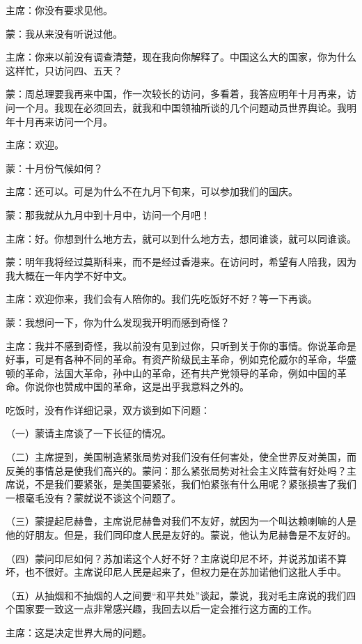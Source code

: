 主席：你没有要求见他。

蒙：我从来没有听说过他。

主席：你来以前没有调查清楚，现在我向你解释了。中国这么大的国家，你为什么这样忙，只访问四、五天？

蒙：周总理要我再来中国，作一次较长的访问，多看着，我答应明年十月再来，访问一个月。我现在必须回去，就我和中国领袖所谈的几个问题动员世界舆论。我明年十月再来访问一个月。

主席：欢迎。

蒙：十月份气候如何？

主席：还可以。可是为什么不在九月下旬来，可以参加我们的国庆。

蒙：那我就从九月中到十月中，访问一个月吧！

主席：好。你想到什么地方去，就可以到什么地方去，想同谁谈，就可以同谁谈。

蒙：明年我将经过莫斯科来，而不是经过香港来。在访问时，希望有人陪我，因为我大概在一年内学不好中文。

主席：欢迎你来，我们会有人陪你的。我们先吃饭好不好？等一下再谈。

蒙：我想问一下，你为什么发现我开明而感到奇怪？

主席：我并不感到奇怪，我以前没有见到过你，只听到关于你的事情。你说革命是好事，可是有各种不同的革命。有资产阶级民主革命，例如克伦威尔的革命，华盛顿的革命，法国大革命，孙中山的革命，还有共产党领导的革命，例如中国的革命。你说你也赞成中国的革命，这是出乎我意料之外的。

吃饭时，没有作详细记录，双方谈到如下问题：

（一）蒙请主席谈了一下长征的情况。

（二）主席提到，美国制造紧张局势对我们没有任何害处，使全世界反对美国，而反美的事情总是使我们高兴的。蒙问：那么紧张局势对社会主义阵营有好处吗？主席说，不是我们要紧张，是美国要紧张，我们怕紧张有什么用呢？紧张损害了我们一根毫毛没有？蒙就说不谈这个问题了。

（三）蒙提起尼赫鲁，主席说尼赫鲁对我们不友好，就因为一个叫达赖喇嘛的人是他的好朋友。但是，我们同印度人民是友好的。蒙说，他认为尼赫鲁是不友好的。

（四）蒙问印尼如何？苏加诺这个人好不好？主席说印尼不坏，并说苏加诺不算坏，也不很好。主席说印尼人民是起来了，但权力是在苏加诺他们这批人手中。

（五）从抽烟和不抽烟的人之间要“和平共处”谈起，蒙说，我对毛主席说的我们四个国家要一致这一点非常感兴趣，我回去以后一定会推行这方面的工作。

主席：这是决定世界大局的问题。

